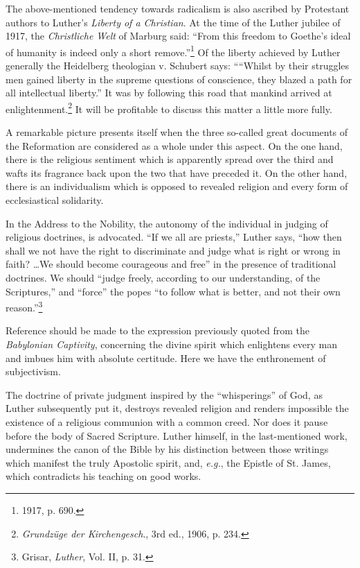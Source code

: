 The above-mentioned tendency towards radicalism is also ascribed
by Protestant authors to Luther’s \textit{Liberty of a Christian}. At the time
of the Luther jubilee of 1917, the \textit{Christliche Welt} of Marburg said:
“From this freedom to Goethe’s ideal of humanity is indeed only a
short remove.”\footnote{1917, p. 690.}
Of the liberty achieved by Luther generally the
Heidelberg theologian v. Schubert says: ““Whilst by their struggles men
gained liberty in the supreme questions of conscience, they blazed
a path for all intellectual liberty.” It was by following this road that
mankind arrived at enlightenment.\footnote{\textit{Grundzüge der Kirchengesch}., 3rd ed., 1906, p. 234.}
It will be profitable to discuss this matter a little more fully.

A remarkable picture presents itself when the three so-called great
documents of the Reformation are considered as a whole under this
aspect. On the one hand, there is the religious sentiment which is
apparently spread over the third and wafts its fragrance back upon
the two that have preceded it. On the other hand, there is an individualism
which is opposed to revealed religion and every form of
ecclesiastical solidarity.

In the Address to the Nobility, the autonomy of the individual in judging
of religious doctrines, is advocated. “If we all are priests,” Luther says,
“how then shall we not have the right to discriminate and judge what is
right or wrong in faith? \dots We should become courageous and free” in
the presence of traditional doctrines. We should “judge freely, according to
our understanding, of the Scriptures,” and “force” the popes “to follow
what is better, and not their own reason.”\footnote{Grisar, \textit{Luther}, Vol. II, p. 31.}

Reference should be made to the expression previously quoted from the
\textit{Babylonian Captivity}, concerning the divine spirit which enlightens every
man and imbues him with absolute certitude. Here we have the enthronement
of subjectivism.

The doctrine of private judgment inspired by the “whisperings” of God,
as Luther subsequently put it, destroys revealed religion and renders impossible
the existence of a religious communion with a common creed. Nor
does it pause before the body of Sacred Scripture. Luther himself, in the
last-mentioned work, undermines the canon of the Bible by his distinction
between those writings which manifest the truly Apostolic spirit, and, \textit{e.g.},
the Epistle of St. James, which contradicts his teaching on good works.

